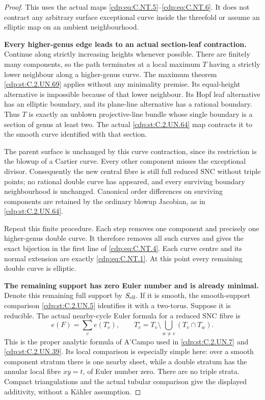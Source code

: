 \begin{proof}
This uses the actual maps \eqref{cdp:eq:C.NT.5}--\eqref{cdp:eq:C.NT.6}. It does
not contract any arbitrary surface exceptional curve
inside the threefold or assume an elliptic map on an
ambient neighbourhood.

\par\medskip\noindent\textbf{Every higher-genus edge leads to an actual section-leaf contraction.}
Continue along strictly increasing heights whenever
possible. There are finitely many components, so the
path terminates at a local maximum $T$ having a
strictly lower neighbour along a higher-genus curve.
The maximum theorem \ref{cdp:st:C.2.UN.69} applies without any
minimality premise. Its equal-height alternative is
impossible because of that lower neighbour. Its Hopf
leaf alternative has an elliptic boundary, and its
plane-line alternative has a rational boundary.
Thus $T$ is exactly an unblown projective-line
bundle whose single boundary is a section of genus
at least two. The actual \ref{cdp:st:C.2.UN.64} map contracts it
to the smooth curve identified with that section.

The parent surface is unchanged by this curve
contraction, since its restriction is the blowup
of a Cartier curve. Every other component misses
the exceptional divisor. Consequently the new
central fibre is still full reduced SNC without
triple points; no rational double curve has appeared,
and every surviving boundary neighbourhood is
unchanged. Canonical order differences on surviving
components are retained by the ordinary blowup
Jacobian, as in \ref{cdp:st:C.2.UN.64}.

Repeat this finite procedure. Each step removes
one component and precisely one higher-genus double
curve. It therefore removes all such curves and
gives the exact bijection in the first line of
\eqref{cdp:eq:C.NT.4}. Each curve centre and its normal extension
are exactly \eqref{cdp:eq:C.NT.1}. At this point every remaining
double curve is elliptic.

\par\medskip\noindent\textbf{The remaining support has zero Euler number and is already minimal.}
Denote this remaining full support by $S_{\rm ell}$.
If it is smooth, the smooth-support comparison \ref{cdp:st:C.2.UN.5}
identifies it with a two-torus. Suppose it is
reducible. The actual nearby-cycle Euler formula
for a reduced SNC fibre is
\[
        e(F)=\sum_v e(T_v^\circ),\qquad
        T_v^\circ=T_v\setminus
                          \bigcup_{w\ne v}(T_v\cap T_w).
\tag{C.NT.7}\label{cdp:eq:C.NT.7}
\]
This is the proper analytic formula of A'Campo used
in \ref{cdp:st:C.2.UN.7} and \ref{cdp:st:C.2.UN.39}. Its local comparison is especially
simple here: over a smooth component stratum there
is one nearby sheet, while a double stratum has
the annular local fibre $xy=t$, of Euler number zero.
There are no triple strata. Compact triangulations
and the actual tubular comparison give the displayed
additivity, without a Kähler assumption.


\end{proof}

